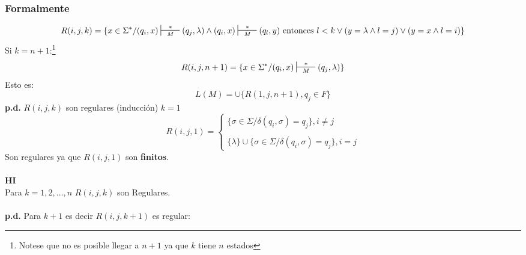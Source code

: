\begin{enumerate}
\subsubsection*{Formalmente}
$$R(i,j,k)= \{ x\in\Sigma^* / (q_i,x)\sststile{M}{\hspace{0.25cm} * \hspace{0.25cm}} (q_j,\lambda) \wedge (q_i,x) \sststile{M}{\hspace{0.25cm} * \hspace{0.25cm}} (q_l,y) \text{ entonces } l<k \vee (y=\lambda \wedge l=j) \vee (y=x \wedge l=i) \}
$$
Si $k=n+1$:\footnote{Notese que no es posible llegar a $n+1$ ya que $k$ tiene $n$ estados}
$$
R(i,j,n+1)=\{ x\in\Sigma^* / (q_i,x) \sststile{M}{\hspace{0.25cm} * \hspace{0.25cm}} (q_j,\lambda)\}
$$
Esto es:
$$
L(M) = \cup\{ R(1,j,n+1),q_j \in F \}
$$
\textbf{p.d.} $R(i,j,k)$ son regulares (inducción) $k=1$
$$
R(i,j,1) =
\begin{cases}
\{ \sigma\in\Sigma / \delta(q_i,\sigma)=q_j \},  i\neq j \\ \\
\{\lambda \} \cup \{ \sigma\in\Sigma / \delta(q_i,\sigma)=q_j \} , i= j
\end{cases}
$$
Son regulares ya que $R(i,j,1)$ son \textbf{finitos}. \\${ }$\\
\textbf{HI} \\
Para $k=1,2,\ldots,n$ $R(i,j,k)$ son Regulares. \\${ }$\\
\textbf{p.d.} Para $k+1$ es decir $R(i,j,k+1)$ es regular:

\begin{figure}[H]
\centering
{}
\end{figure}
\end{enumerate}
